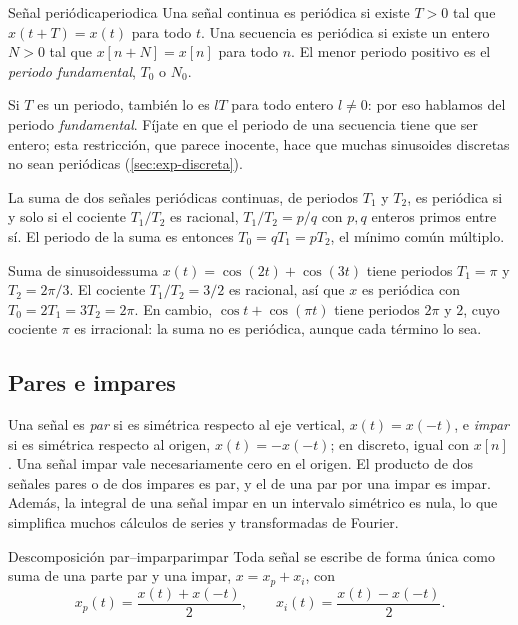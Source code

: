 \documentclass[11pt,a4paper]{scrartcl}
\begin{document}
\begin{definicion}{Señal periódica}{periodica}
  Una señal continua es periódica si existe $T>0$ tal que $x(t+T)=x(t)$ para todo $t$. Una secuencia es periódica si existe un entero $N>0$ tal que $x[n+N]=x[n]$ para todo $n$. El menor periodo positivo es el \emph{periodo fundamental}, $T_0$ o $N_0$.
\end{definicion}

Si $T$ es un periodo, también lo es $lT$ para todo entero $l\ne0$: por eso hablamos del periodo \emph{fundamental}. Fíjate en que el periodo de una secuencia tiene que ser entero; esta restricción, que parece inocente, hace que muchas sinusoides discretas no sean periódicas (\cref{sec:exp-discreta}).

La suma de dos señales periódicas continuas, de periodos $T_1$ y $T_2$, es periódica si y solo si el cociente $T_1/T_2$ es racional, $T_1/T_2=p/q$ con $p,q$ enteros primos entre sí. El periodo de la suma es entonces $T_0=qT_1=pT_2$, el mínimo común múltiplo.

\begin{ejemplo}{Suma de sinusoides}{suma}
  $x(t)=\cos(2t)+\cos(3t)$ tiene periodos $T_1=\pi$ y $T_2=2\pi/3$. El cociente $T_1/T_2=3/2$ es racional, así que $x$ es periódica con $T_0=2T_1=3T_2=2\pi$.
  En cambio, $\cos t+\cos(\pi t)$ tiene periodos $2\pi$ y $2$, cuyo cociente $\pi$ es irracional: la suma no es periódica, aunque cada término lo sea.
\end{ejemplo}

\subsection{Pares e impares}

Una señal es \emph{par} si es simétrica respecto al eje vertical, $x(t)=x(-t)$, e \emph{impar} si es simétrica respecto al origen, $x(t)=-x(-t)$; en discreto, igual con $x[n]$. Una señal impar vale necesariamente cero en el origen. El producto de dos señales pares o de dos impares es par, y el de una par por una impar es impar. Además, la integral de una señal impar en un intervalo simétrico es nula, lo que simplifica muchos cálculos de series y transformadas de Fourier.

\begin{propiedad}{Descomposición par–impar}{parimpar}
  Toda señal se escribe de forma única como suma de una parte par y una impar, $x=x_p+x_i$, con
  \[
    x_p(t)=\frac{x(t)+x(-t)}{2},\qquad x_i(t)=\frac{x(t)-x(-t)}{2}.
  \]
\end{propiedad}
\end{document}
